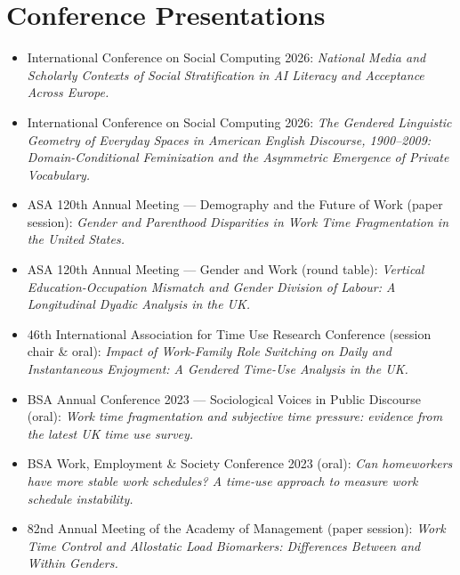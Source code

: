 \documentclass[11pt,a4paper]{article}
\begin{document}
\section*{Conference Presentations}
\begin{itemize}
\item International Conference on Social Computing 2026: \textit{National Media and Scholarly Contexts of Social Stratification in AI Literacy and Acceptance Across Europe.}
\item International Conference on Social Computing 2026: \textit{The Gendered Linguistic Geometry of Everyday Spaces in American English Discourse, 1900--2009: Domain-Conditional Feminization and the Asymmetric Emergence of Private Vocabulary.}
\item ASA 120th Annual Meeting --- Demography and the Future of Work (paper session): \textit{Gender and Parenthood Disparities in Work Time Fragmentation in the United States.}
\item ASA 120th Annual Meeting --- Gender and Work (round table): \textit{Vertical Education-Occupation Mismatch and Gender Division of Labour: A Longitudinal Dyadic Analysis in the UK.}
\item 46th International Association for Time Use Research Conference (session chair \& oral): \textit{Impact of Work-Family Role Switching on Daily and Instantaneous Enjoyment: A Gendered Time-Use Analysis in the UK.}
\item BSA Annual Conference 2023 --- Sociological Voices in Public Discourse (oral): \textit{Work time fragmentation and subjective time pressure: evidence from the latest UK time use survey.}
\item BSA Work, Employment \& Society Conference 2023 (oral): \textit{Can homeworkers have more stable work schedules? A time-use approach to measure work schedule instability.}
\item 82nd Annual Meeting of the Academy of Management (paper session): \textit{Work Time Control and Allostatic Load Biomarkers: Differences Between and Within Genders.}
\end{itemize}

\end{document}
